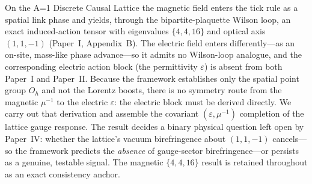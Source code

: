 On the A=1 Discrete Causal Lattice the magnetic field enters the tick rule as a
spatial link phase and yields, through the bipartite-plaquette Wilson loop, an exact
induced-action tensor with eigenvalues $\{4,4,16\}$ and optical axis $(1,1,-1)$
(Paper~I, Appendix~B). The electric field enters differently---as an on-site,
mass-like phase advance---so it admits no Wilson-loop analogue, and the corresponding
electric action block (the permittivity $\varepsilon$) is absent from both Paper~I and
Paper~II. Because the framework establishes only the spatial point group $O_h$ and not
the Lorentz boosts, there is no symmetry route from the magnetic $\mu^{-1}$ to the
electric $\varepsilon$: the electric block must be derived directly. We carry out that
derivation and assemble the covariant $(\varepsilon,\mu^{-1})$ completion of the
lattice gauge response. The result decides a binary physical question left open by
Paper~IV: whether the lattice's vacuum birefringence about $(1,1,-1)$ cancels---so the
framework predicts the \emph{absence} of gauge-sector birefringence---or persists as a
genuine, testable signal. The magnetic $\{4,4,16\}$ result is retained throughout as an
exact consistency anchor.
